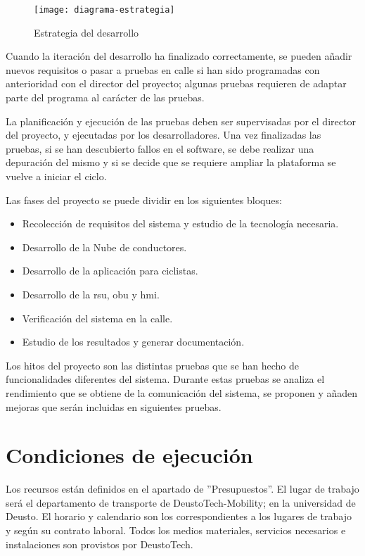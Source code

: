 \begin{figure}[t]
	\begin{center}
		\texttt{[image: diagrama-estrategia]}
		\caption{Estrategia del desarrollo}
		\label{fig:estrategia}
	\end{center}
\end{figure}

Cuando la iteración del desarrollo ha finalizado correctamente, se pueden
añadir nuevos requisitos o pasar a pruebas en calle si han sido programadas
con anterioridad con el director del proyecto; algunas pruebas requieren de
adaptar parte del programa al carácter de las pruebas.

La planificación y ejecución de las pruebas deben ser supervisadas por el
director del proyecto, y ejecutadas por los desarrolladores. Una vez
finalizadas las pruebas, si se han descubierto fallos en el software, se debe
realizar una depuración del mismo y si se decide que se requiere ampliar la
plataforma se vuelve a iniciar el ciclo.

Las fases del proyecto se puede dividir en los siguientes bloques:
\begin{itemize}
	\item Recolección de requisitos del sistema y estudio de la tecnología
	necesaria.

	\item Desarrollo de la Nube de conductores.

	\item Desarrollo de la aplicación para ciclistas.

	\item Desarrollo de la \gls{rsu}, \gls{obu} y \gls{hmi}.

	\item Verificación del sistema en la calle.

	\item Estudio de los resultados y generar documentación.
\end{itemize}

Los hitos del proyecto son las distintas pruebas que se han hecho de
funcionalidades diferentes del sistema. Durante estas pruebas se analiza el
rendimiento que se obtiene de la comunicación del sistema, se proponen y añaden
mejoras que serán incluidas en siguientes pruebas.
\section{Condiciones de ejecución}
Los recursos están definidos en el apartado de ''Presupuestos''. El lugar de
trabajo será el departamento de transporte de DeustoTech-Mobility; en la
universidad de Deusto. El horario y calendario son los correspondientes a los
lugares de trabajo y según su contrato laboral. Todos los medios materiales,
servicios necesarios e instalaciones son provistos por DeustoTech.


